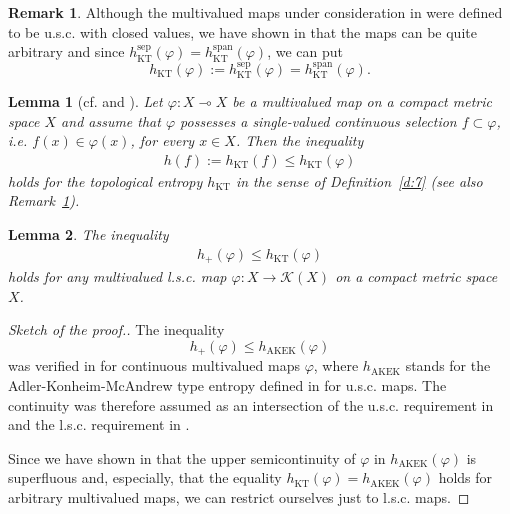 \documentclass[12pt]{amsart}
\newtheorem{lemma}{Lemma}
\theoremstyle{definition}
\newtheorem{remark}{Remark}
\newcommand{\K}{\mathcal{K}}
\newcommand{\vp}{\varphi}
\newcommand{\spa}{\operatorname{span}}
\newcommand{\sepp}{\operatorname{sep}}
\newcommand{\KT}{\operatorname{KT}}
\newcommand{\AK}{\operatorname{AKEK}}
\newcommand{\hKT}{h_{\KT}}
\begin{document}
\begin{remark}\label{r:2}
Although the multivalued maps under consideration in \cite{KT} were defined to be u.s.c. with closed values, we have shown in \cite{AL3} that the maps can be quite arbitrary and since $\hKT^{\sepp}(\vp)=\hKT^{\spa}(\vp)$, we can put
\[
\hKT(\vp):= \hKT^{\sepp}(\vp)=\hKT^{\spa}(\vp).
\]
\end{remark}

\begin{lemma}[cf. {\cite[Theorem 4.2]{KT}} and {\cite[Remark 3.5]{AL3}}]\label{l:3}
Let $\vp:X\multimap X$ be a multivalued map on a compact metric space $X$ and assume that $\vp$ possesses a single-valued continuous selection $f\subset\vp$, i.e. $f(x)\in\vp(x)$, for every $x\in X$. Then the inequality 
\begin{align}\label{eq:A2}
h(f):= \hKT(f)\leq\hKT(\vp)
\end{align}
holds for the topological entropy $\hKT$ in the sense of Definition~\ref{d:7} (see also Remark~\ref{r:2}).
\end{lemma}


\begin{lemma}\label{l:4}
The inequality
\begin{align}\label{eq:A3}
h_+(\vp) \leq \hKT(\vp)
\end{align}
holds for any multivalued l.s.c. map $\vp:X\to\K(X)$ on a compact metric space $X$.
\end{lemma}
\begin{proof}[Sketch of the proof.]
The inequality 
\[
h_+(\vp) \leq h_{\AK}(\vp)
\]
was verified in \cite[Theorem 3]{AL1} for continuous multivalued maps $\vp$, where $h_{\AK}$ stands for the Adler-Konheim-McAndrew type entropy defined in \cite{AK,EK} for u.s.c. maps. The continuity was therefore assumed as an intersection of the u.s.c. requirement in \cite{AK,EK} and the l.s.c. requirement in \cite{AL1}.

Since we have shown in \cite[Theorem 3.4]{AL3} that the upper semicontinuity  of $\vp$ in $h_{\AK}(\vp)$ is superfluous and, especially, that the equality $\hKT(\vp)=h_{\AK}(\vp)$ holds for arbitrary multivalued maps, we can restrict ourselves just to l.s.c. maps.
\end{proof}
\end{document}
